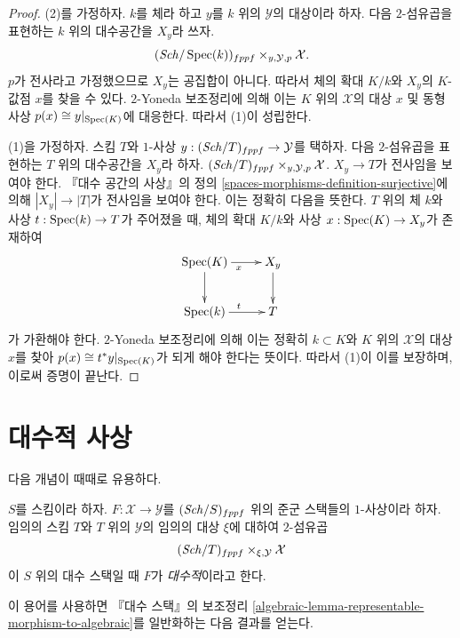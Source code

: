 \begin{proof}
(2)를 가정하자. $k$를 체라 하고 $y$를 $k$ 위의
$\mathcal{Y}$의 대상이라 하자. 다음 $2$-섬유곱을 표현하는
$k$ 위의 대수공간을 $X_y$라 쓰자.
$$
(\mathit{Sch}/\mathop{\mathrm{Spec}}(k))_{fppf} \times_{y, \mathcal{Y}, p} \mathcal{X}.
$$
$p$가 전사라고 가정했으므로 $X_y$는 공집합이 아니다.
따라서 체의 확대 $K/k$와 $X_y$의 $K$-값점 $x$를 찾을 수 있다.
$2$-Yoneda 보조정리에 의해 이는 $K$ 위의 $\mathcal{X}$의 대상
$x$ 및 동형사상 $p(x) \cong y|_{\mathop{\mathrm{Spec}}(K)}$에 대응한다.
따라서 (1)이 성립한다.

\medskip\noindent
(1)을 가정하자. 스킴 $T$와 $1$-사상
$y : (\mathit{Sch}/T)_{fppf} \to \mathcal{Y}$를 택하자. 다음 $2$-섬유곱을
표현하는 $T$ 위의 대수공간을 $X_y$라 하자.
$(\mathit{Sch}/T)_{fppf} \times_{y, \mathcal{Y}, p} \mathcal{X}$.
$X_y \to T$가 전사임을 보여야 한다. 『대수 공간의 사상』의 정의
\ref{spaces-morphisms-definition-surjective}에 의해
$|X_y| \to |T|$가 전사임을 보여야 한다. 이는 정확히 다음을 뜻한다.
$T$ 위의 체 $k$와 사상 $t : \mathop{\mathrm{Spec}}(k) \to T$가 주어졌을 때,
체의 확대 $K/k$와 사상 $x : \mathop{\mathrm{Spec}}(K) \to X_y$가 존재하여
$$
\xymatrix{
\Spec(K) \ar[d] \ar[r]_x & X_y \ar[d] \\
\Spec(k) \ar[r]^t & T
}
$$
가 가환해야 한다. $2$-Yoneda 보조정리에 의해 이는 정확히
$k \subset K$와 $K$ 위의 $\mathcal{X}$의 대상 $x$를 찾아
$p(x) \cong t^*y|_{\mathop{\mathrm{Spec}}(K)}$가 되게 해야 한다는 뜻이다.
따라서 (1)이 이를 보장하며, 이로써 증명이 끝난다.
\end{proof}












\section{대수적 사상}
\label{section-algebraic}

\noindent
다음 개념이 때때로 유용하다.

\begin{definition}
\label{definition-algebraic}
$S$를 스킴이라 하자. $F : \mathcal{X} \to \mathcal{Y}$를
$(\mathit{Sch}/S)_{fppf}$ 위의 준군 스택들의 $1$-사상이라 하자.
임의의 스킴 $T$와 $T$ 위의 $\mathcal{Y}$의 임의의 대상 $\xi$에
대하여 $2$-섬유곱
$$
(\mathit{Sch}/T)_{fppf} \times_{\xi, \mathcal{Y}} \mathcal{X}
$$
이 $S$ 위의 대수 스택일 때 $F$가 {\it 대수적}이라고 한다.
\end{definition}

\noindent
이 용어를 사용하면 『대수 스택』의 보조정리
\ref{algebraic-lemma-representable-morphism-to-algebraic}를 일반화하는
다음 결과를 얻는다.

